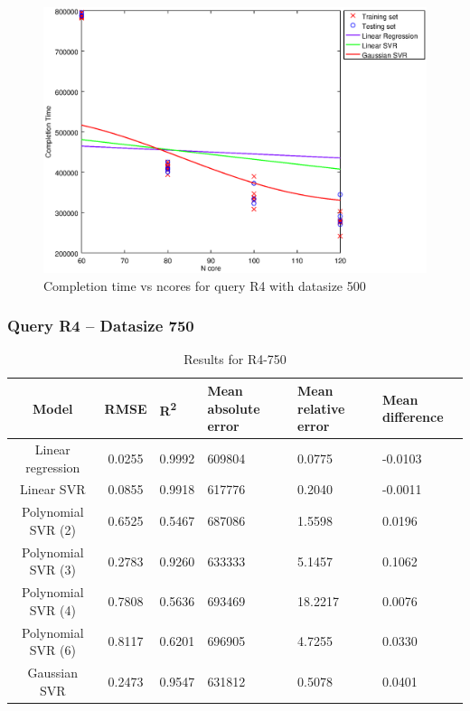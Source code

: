 \documentclass[a4paper,11pt]{article}
\begin{document}
\begin {figure}[hbtp]
\centering
\includegraphics[width=\textwidth]{output/R4_500_LINEAR_NCORE/plot_R4_500_bestmodels.eps}
\caption{Completion time vs ncores for query R4 with datasize 500}
\label{fig:all_linear_R4_500}
\end {figure}

\newpage
\subsubsection{Query R4 -- Datasize 750}
\begin{table}[H]
	\centering
	\begin{adjustbox}{center}
		\begin{tabular}{c | c M{1.2cm} M{2.5cm} M{2.5cm} M{1.8cm}}
			Model & RMSE & R\textsuperscript{2} & Mean absolute error & Mean relative error & Mean difference \tabularnewline
			\hline
			Linear regression & 0.0255 & 0.9992 & 609804 & 0.0775 & -0.0103 \\
			Linear SVR & 0.0855 & 0.9918 & 617776 & 0.2040 & -0.0011 \\
			Polynomial SVR (2) & 0.6525 & 0.5467 & 687086 & 1.5598 & 0.0196 \\
			Polynomial SVR (3) & 0.2783 & 0.9260 & 633333 & 5.1457 & 0.1062 \\
			Polynomial SVR (4) & 0.7808 & 0.5636 & 693469 & 18.2217 & 0.0076 \\
			Polynomial SVR (6) & 0.8117 & 0.6201 & 696905 & 4.7255 & 0.0330 \\
			Gaussian SVR & 0.2473 & 0.9547 & 631812 & 0.5078 & 0.0401 \\
		\end{tabular}
	\end{adjustbox}
	\\
	\caption{Results for R4-750}
	\label{fig:all_linear_R4_750}
\end{table}
\end{document}
